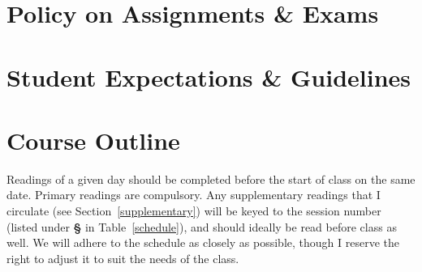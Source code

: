 \documentclass[titlepage]{article}
\newcommand\policy{../policy}
\begin{document}


\section{Policy on Assignments \& Exams}
\label{policy}





\section{Student Expectations \& Guidelines}
\label{expectations}







\section{Course Outline}
\label{outline}

Readings of a given day should be completed before the start of class
on the same date. Primary readings are compulsory. Any supplementary
readings that I circulate (see Section~\ref{supplementary}) will
be keyed to the session number (listed under \textbf{\S} in
Table~\ref{schedule}), and should ideally be read before class as well.
We will adhere to the schedule as closely as possible, though I reserve
the right to adjust it to suit the needs of the class.

\newcommand\Yhwh{\textsc{Yhwh}}
\newcommand\rarr{\char"2192\hspace*{0.5pt}}
\end{document}

